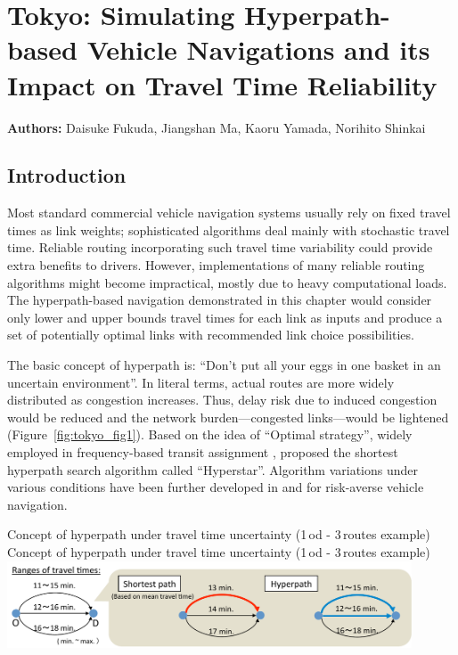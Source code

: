 \chapter{Tokyo: Simulating Hyperpath-based Vehicle Navigations and its Impact on Travel Time Reliability}
\label{ch:tokyo}
\hfill \textbf{Authors:} Daisuke Fukuda, Jiangshan Ma, Kaoru Yamada, Norihito Shinkai

\section{Introduction}
Most standard commercial vehicle navigation systems usually rely on fixed travel times as link weights; sophisticated algorithms deal mainly with stochastic travel time. Reliable routing incorporating such travel time variability could provide extra benefits to drivers. However, implementations of many reliable routing algorithms might become impractical, mostly due to heavy computational loads. The hyperpath-based navigation demonstrated in this chapter would consider only lower and upper bounds travel times for each link as inputs and produce a set of potentially optimal links with recommended link choice possibilities.  

The basic concept of hyperpath is:  ``Don't put all your eggs in one basket in an uncertain environment''. In literal terms, actual routes are more widely distributed as congestion increases. Thus, delay risk due to induced congestion would be reduced and the network burden---congested links---would be lightened (Figure~\ref{fig:tokyo_fig1}). Based on the idea of ``Optimal strategy'', widely employed in frequency-based transit assignment \citep[see][]{Spiess1989}, \citet{Bell2009} proposed the shortest hyperpath search algorithm called ``Hyperstar''.  Algorithm variations under various conditions have been further developed in \citet{Bell2012} and \citet{Ma2013} for risk-averse vehicle navigation.

\createfigure%
{Concept of hyperpath under travel time uncertainty (1\,\gls{od} - 3\,routes example)}%
{Concept of hyperpath under travel time uncertainty (1\,\gls{od} - 3\,routes example)}%
{\label{fig:tokyo_fig1}}%
{\includegraphics[width=0.90\textwidth, angle=0]{./scenarios/figures/tokyo_fig1.pdf}}%
{}

